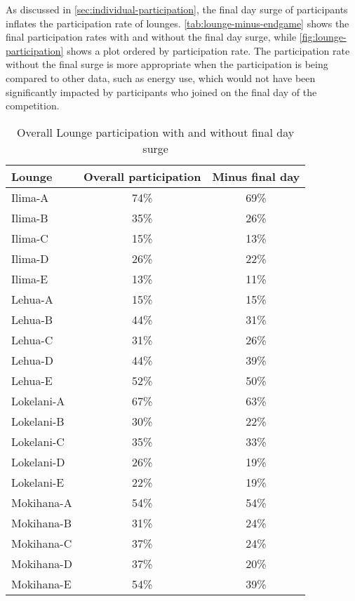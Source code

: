 As discussed in \autoref{sec:individual-participation}, the final day surge of participants inflates the participation rate of lounges. \autoref{tab:lounge-minus-endgame} shows the final participation rates with and without the final day surge, while \autoref{fig:lounge-participation} shows a plot ordered by participation rate. The participation rate without the final surge is more appropriate when the participation is being compared to other data, such as energy use, which would not have been significantly impacted by participants who joined on the final day of the competition.

\begin{table}[htbp]
	\centering
		\begin{tabular}{| l | c | c |}
			\hline
			Lounge & Overall participation & Minus final day \\ \hline
			Ilima-A & 74\% & 69\% \\ \hline
			Ilima-B & 35\% & 26\% \\ \hline
			Ilima-C & 15\% & 13\% \\ \hline
			Ilima-D & 26\% & 22\% \\ \hline
			Ilima-E & 13\% & 11\% \\ \hline
			Lehua-A & 15\% & 15\% \\ \hline
			Lehua-B & 44\% & 31\% \\ \hline
			Lehua-C & 31\% & 26\% \\ \hline
			Lehua-D & 44\% & 39\% \\ \hline
			Lehua-E & 52\% & 50\% \\ \hline
			Lokelani-A & 67\% & 63\% \\ \hline
			Lokelani-B & 30\% & 22\% \\ \hline
			Lokelani-C & 35\% & 33\% \\ \hline
			Lokelani-D & 26\% & 19\% \\ \hline
			Lokelani-E & 22\% & 19\% \\ \hline
			Mokihana-A & 54\% & 54\% \\ \hline
			Mokihana-B & 31\% & 24\% \\ \hline
			Mokihana-C & 37\% & 24\% \\ \hline
			Mokihana-D & 37\% & 20\% \\ \hline
			Mokihana-E & 54\% & 39\% \\ \hline
		\end{tabular}
	\caption{Overall Lounge participation with and without final day surge}
\label{tab:lounge-minus-endgame}
\end{table}

